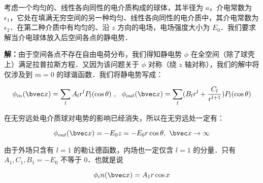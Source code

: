 考虑一个均匀的、线性各向同性的电介质构成的球体，其半径为 $a$，介电常数为 $\epsilon_1$，它处在填满无穷空间的另一种均匀、线性各向同性的电介质中，其介电常数为 $\epsilon_2$．在第二种介质中有均匀的、沿 $z$ 方向的电场，电场强度大小为 $E_0$．我们要求解当介电球体放入后空间各点的静电势．

\textbf{解：}由于空间各点不存在自由电荷分布，我们得知静电势 $\phi$  在全空间（除了球壳上）满足拉普拉斯方程．又因为该问题关于 $\phi$ 对称（绕 $z$ 轴对称），我们的解中将仅涉及到 $m=0$ 的球谐函数．我们将静电势写成：

\begin{equation}
\phi_{in}(\bvec x)=\sum_{l}A_lr^lP_l(\cos \theta)\ ,\ \ \phi_{out}(\bvec x)=\sum_{l}(B_lr^l+\frac{C_l}{r^{l+1}})P_l(\cos \theta)
\end{equation}

在无穷远处电介质球对电势的影响已经消失，所以在无穷远处一定有：

\begin{equation}
\phi_{out}(\bvec x)=-E_0z=-E_0r\cos\theta,\ \bvec x\rightarrow \infty
\end{equation}

由于外场只含有 $l=1$ 的勒让德函数，内场也一定仅含 $l=1$ 的分量．只有 $A_1,C_1,B_1=-E_0$ 不等于 $0$．也就是说

\begin{equation}
\phi_in(\bvec x)=A_1r\cos x
\end{equation}